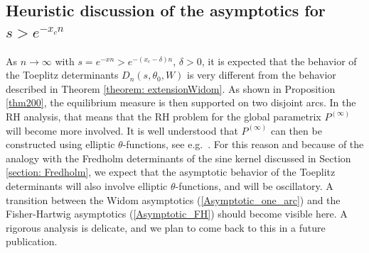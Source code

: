 \documentclass[11pt,fleqn]{article}
\numberwithin{equation}{section}
\def\bigO{{\cal O}}
\begin{document}



\subsection{Heuristic discussion of the asymptotics for $s>e^{-x_cn}$}\label{section: elliptic}

As $n\to\infty$ with $s=e^{-xn}>e^{-(x_c-\delta)n}$, $\delta>0$, it is expected that the behavior of the Toeplitz determinants $D_n(s,\theta_0,W)$ is very different from the behavior described in Theorem \ref{theorem: extensionWidom}. As shown in Proposition \ref{thm200}, the equilibrium measure is then supported on two disjoint arcs. In the RH analysis, that means that the RH problem for the global parametrix $P^{(\infty)}$ will become more involved. It is well understood that $P^{(\infty)}$ can then be constructed using elliptic $\theta$-functions, see e.g.\ \cite{Bleher, DKMVZ2, DKMVZ1}. For this reason and because of the analogy with the Fredholm determinants of the sine kernel discussed in Section \ref{section: Fredholm}, we expect that the asymptotic behavior of the Toeplitz determinants will also involve elliptic $\theta$-functions, and will be oscillatory. A transition between the Widom asymptotics (\ref{Asymptotic_one_arc}) and the Fisher-Hartwig asymptotics (\ref{Asymptotic_FH}) should become visible here.
A rigorous analysis is delicate, and we plan to come back to this in a future publication.
\end{document}
